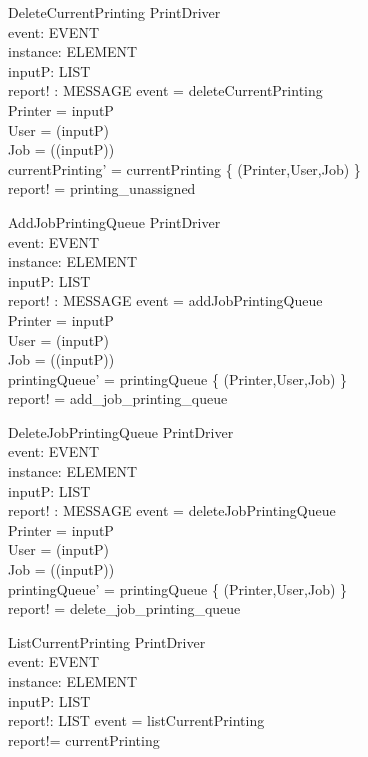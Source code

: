 \begin{schema}{DeleteCurrentPrinting}
\Delta PrintDriver \\
event: EVENT \\
instance: ELEMENT \\
inputP: LIST \\
report! : MESSAGE
\where event = deleteCurrentPrinting \\
Printer = \head inputP \\
User = \head (\tail inputP) \\
Job = \head (\tail (\tail inputP)) \\
currentPrinting' = currentPrinting \setminus \{ (Printer,User,Job) \} \\
report! = printing\_unassigned
\end{schema}

\begin{schema}{AddJobPrintingQueue}
\Delta PrintDriver \\
event: EVENT \\
instance: ELEMENT \\
inputP: LIST \\
report! : MESSAGE
\where event = addJobPrintingQueue \\
Printer = \head inputP \\
User = \head (\tail inputP) \\
Job = \head (\tail (\tail inputP)) \\
printingQueue' = printingQueue \uni \{ (Printer,User,Job) \} \\
report! = add\_job\_printing\_queue
\end{schema}

\begin{schema}{DeleteJobPrintingQueue}
\Delta PrintDriver \\
event: EVENT \\
instance: ELEMENT \\
inputP: LIST \\
report! : MESSAGE
\where event = deleteJobPrintingQueue \\
Printer = \head inputP \\
User = \head (\tail inputP) \\
Job = \head (\tail (\tail inputP)) \\
printingQueue' = printingQueue \setminus \{ (Printer,User,Job) \} \\
report! = delete\_job\_printing\_queue
\end{schema}

\begin{schema}{ListCurrentPrinting}
\Delta PrintDriver \\
event: EVENT \\
instance: ELEMENT \\
inputP: LIST \\
report!: LIST
\where event = listCurrentPrinting \\
report!= currentPrinting
\end{schema}

